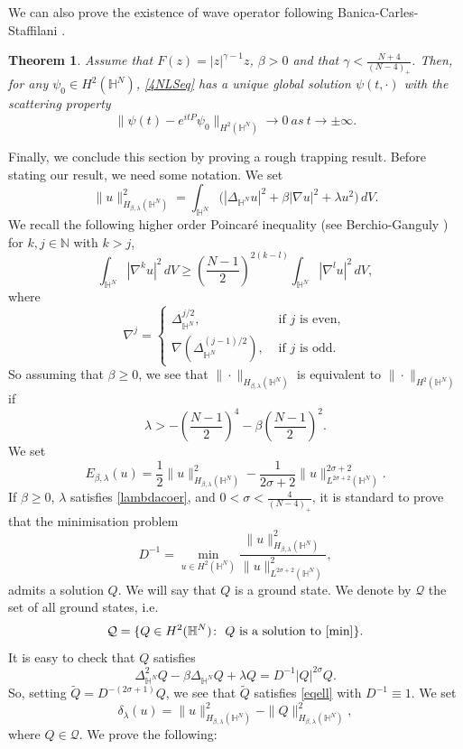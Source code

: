 \documentclass[10pt,leqno]{amsart}
\newtheorem{thm}{Theorem}[section]
\numberwithin{equation}{section}
\newcommand{\field}[1]{\mathbb{#1}}
\newcommand{\N}{\field{N}}          		%
\newcommand{\Hy}{\field{H}}
\begin{document}
We can also prove the existence of wave operator following Banica-Carles-Staffilani \cite{BaCaSt}.

\begin{thm}
Assume that $F(z)=|z|^{\gamma -1} z$, $\beta>0$ and that $\gamma <\tfrac{N+4}{(N-4)_+}$. Then, for any $\psi_0\in H^2 (\Hy^N)$, \eqref{4NLSeq} has a unique global solution $\psi(t,\cdot)$ with the scattering property 
$$\|\psi(t) - e^{itP}\psi_0\|_{H^2 (\Hy^N)} \rightarrow 0\ as\ t\rightarrow \pm \infty .$$
\end{thm}




Finally, we conclude this section by proving a rough trapping result. Before stating our result, we need some notation. We set
$$\|u\|^2_{H_{\beta,\lambda} (\Hy^N)} =\int_{\Hy^N} \big( |\Delta_{\Hy^N}  u|^2 +\beta |\nabla u|^2 +\lambda u^2 \big)\, dV. $$
We recall the following higher order Poincar\' e inequality (see Berchio-Ganguly \cite{BeGa}) for $k,j\in \N$ with $k>j$,
$$\int_{\Hy^N} |\nabla^k u |^2 \,dV \geq (\dfrac{N-1}{2})^{2(k-l)} \int_{\Hy^N} |\nabla^l u|^2 \,dV,$$
where 
$$\nabla^j =\begin{cases} \Delta_{\Hy^N}^{j/2},&\mbox{ if $j$ is even},\\ \nabla (\Delta_{\Hy^N}^{(j-1)/2}),&\mbox{ if $j$ is odd}.  \end{cases}$$
So assuming that $\beta\geq 0$, we see that $\| \cdot\|_{H_{\beta,\lambda}(\Hy^N)}$ is equivalent to $\|\cdot\|_{H^2 (\Hy^N)}$ if 
\begin{equation}
\label{lambdacoer}
\lambda >-\left(\frac{N-1}{2}\right)^4 -\beta \left(\frac{N-1}{2}\right)^2.
\end{equation}
We set
$$E_{\beta,\lambda}(u)= \frac{1}{2}\|u\|^2_{H_{\beta,\lambda} (\Hy^N)}- \frac{1}{2\sigma +2}\|u \|_{L^{2\sigma +2}(\Hy^N)}^{2\sigma +2}.$$
If $\beta \geq 0$, $\lambda$ satisfies \eqref{lambdacoer}, and $0<\sigma<\frac{4}{(N-4)_+}$, it is standard to prove that the minimisation problem
\begin{equation}
\label{min}
D^{-1}=\min_{u\in H^2 (\Hy^N)}\dfrac{\|u\|_{H_{\beta,\lambda} (\Hy^N) }^2 }{\|u\|_{L^{2\sigma +2}(\Hy^N) }^{2} },
\end{equation}
admits a solution $Q$. We will say that $Q$ is a ground state. We denote by $\mathcal{Q}$ the set of all ground states, i.e.
$$\mathcal{Q}=\{Q\in H^2 (\Hy^N)\colon \ Q\ \text{is a  solution to \eqref{min}}\}.$$ 
 It is easy to check that $Q$ satisfies
\begin{equation}
\label{eqell}
\Delta_{\Hy^N}^2 Q -\beta \Delta_{\Hy^N} Q +\lambda Q= D^{-1} |Q|^{2\sigma} Q.
\end{equation}
So, setting $\tilde{Q}= D^{-(2\sigma +1)} Q$, we see that $\tilde{Q}$ satisfies \eqref{eqell} with $D^{-1}\equiv 1$. 
We set $$\delta_\lambda (u)= \|u\|_{H_{\beta,\lambda} (\Hy^N)}^2 - \|Q\|_{H_{\beta,\lambda} (\Hy^N)}^2,$$
 where $Q \in \mathcal{Q}$. We prove the following:
\end{document}
